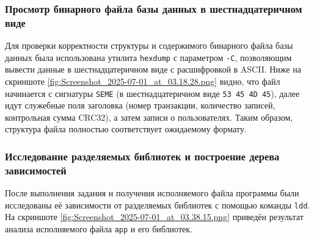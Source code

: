 
\subsubsection{Просмотр бинарного файла базы данных в шестнадцатеричном виде}

Для проверки корректности структуры и содержимого бинарного файла базы данных была использована утилита \texttt{hexdump} с параметром \texttt{-C}, позволяющим вывести данные в шестнадцатеричном виде с расшифровкой в ASCII. Ниже на скриншоте \ref{fig:Screenshot_2025-07-01_at_03.18.28.png} видно, что файл начинается с сигнатуры \texttt{SEME} (в шестнадцатеричном виде \texttt{53 45 4D 45}), далее идут служебные поля заголовка (номер транзакции, количество записей, контрольная сумма CRC32), а затем записи о пользователях. Таким образом, структура файла полностью соответствует ожидаемому формату.


\subsubsection{Исследование разделяемых библиотек и построение дерева зависимостей}

После выполнения задания и получения исполняемого файла программы были исследованы её зависимости от разделяемых библиотек с помощью команды \texttt{ldd}. На скриншоте \ref{fig:Screenshot_2025-07-01_at_03.38.15.png} приведён результат анализа исполняемого файла \texttt{app} и его библиотек.

